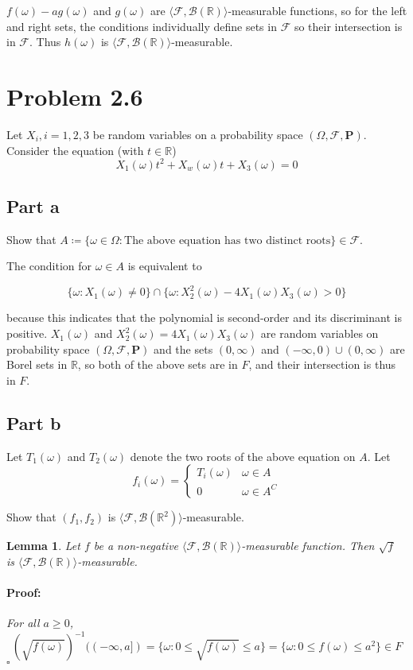 \documentclass{article}
\newenvironment{proof}{\paragraph{Proof:}}{\hfill$\square$}
\newtheorem{lemma}[theorem]{Lemma}
\newcommand{\R}{\mathbb{R}}
\newcommand{\F}{\mathcal{F}}
\newcommand{\B}{\mathcal{B}}
\newcommand{\prob}{\boldsymbol{P}}
\begin{document}
$f(\omega) - ag(\omega)$ and $g(\omega)$ are $\langle \F, \B(\R) \rangle$-measurable functions, so for the left and right sets, the conditions individually define sets in $\F$ so their intersection is in $\F$. Thus $h(\omega)$ is $\langle \F, \B(\R) \rangle$-measurable.

\section*{Problem 2.6}

Let $X_i, i = 1, 2, 3$ be random variables on a probability space $(\Omega, \F, \prob)$. Consider the equation (with $t \in \R$)
\[
X_1(\omega)t^2 + X_w(\omega)t + X_3(\omega) = 0
\]

\subsection*{Part a}
Show that $A \coloneq \{ \omega \in \Omega: \text{The above equation has two distinct roots} \} \in \F$.

The condition for $\omega \in A$ is equivalent to

\[
\{\omega: X_1(\omega) \neq 0 \}\cap \{\omega: X_2^2(\omega) - 4X_1(\omega)X_3(\omega) > 0 \}
\]

because this indicates that the polynomial is second-order and its discriminant is positive. $X_1(\omega)$ and $X_2^2(\omega) = 4X_1(\omega)X_3(\omega)$ are random variables on probability space $(\Omega, \F, \prob)$ and the sets $(0, \infty)$ and $(-\infty, 0) \cup (0, \infty)$ are Borel sets in $\R$, so both of the above sets are in $F$, and their intersection is thus in $F$.

\subsection*{Part b}
Let $T_1(\omega)$ and $T_2(\omega)$ denote the two roots of the above equation on $A$. Let
\[
f_i(\omega) = \begin{cases}
T_i(\omega) & \omega \in A \\
0 & \omega \in A^C
\end{cases}
\]

Show that $(f_1, f_2)$ is $\langle \F, \B(\R^2) \rangle$-measurable.
\begin{lemma}
Let $f$ be a non-negative $\langle \F, \B(\R) \rangle$-measurable function. Then $\sqrt{f}$ is $\langle \F, \B(\R) \rangle$-measurable.
\begin{proof}
For all $a \geq 0$,
\[
(\sqrt{f(\omega)})^{-1}((-\infty, a]) = \{ \omega: 0 \leq \sqrt{f(\omega)} \leq a \} 
= \{\omega : 0 \leq f(\omega) \leq a^2 \}  \in F
\]
\end{proof}
\end{lemma}
\end{document}
